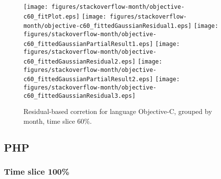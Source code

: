\begin{figure}[t]
\centering
{}
{\texttt{[image: figures/stackoverflow-month/objective-c60\_fitPlot.eps]}}
{\texttt{[image: figures/stackoverflow-month/objective-c60\_fittedGaussianResidual1.eps]}}
{\texttt{[image: figures/stackoverflow-month/objective-c60\_fittedGaussianPartialResult1.eps]}}
{\texttt{[image: figures/stackoverflow-month/objective-c60\_fittedGaussianResidual2.eps]}}
{\texttt{[image: figures/stackoverflow-month/objective-c60\_fittedGaussianPartialResult2.eps]}}
{\texttt{[image: figures/stackoverflow-month/objective-c60\_fittedGaussianResidual3.eps]}}
\caption{Residual-based corretion for language Objective-C, grouped by month, time slice 60\%.}
\end{figure}


\FloatBarrier


\subsection{PHP}

\subsubsection{Time slice 100\%}

